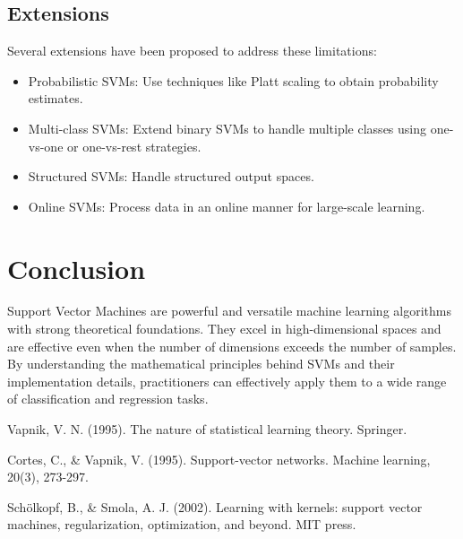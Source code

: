 \documentclass{article}
\begin{document}
\subsection{Extensions}

Several extensions have been proposed to address these limitations:
\begin{itemize}
    \item Probabilistic SVMs: Use techniques like Platt scaling to obtain probability estimates.
    \item Multi-class SVMs: Extend binary SVMs to handle multiple classes using one-vs-one or one-vs-rest strategies.
    \item Structured SVMs: Handle structured output spaces.
    \item Online SVMs: Process data in an online manner for large-scale learning.
\end{itemize}

\section{Conclusion}

Support Vector Machines are powerful and versatile machine learning algorithms with strong theoretical foundations. They excel in high-dimensional spaces and are effective even when the number of dimensions exceeds the number of samples. By understanding the mathematical principles behind SVMs and their implementation details, practitioners can effectively apply them to a wide range of classification and regression tasks.

\begin{thebibliography}{9}
Vapnik, V. N. (1995). The nature of statistical learning theory. Springer.

Cortes, C., \& Vapnik, V. (1995). Support-vector networks. Machine learning, 20(3), 273-297.

Schölkopf, B., \& Smola, A. J. (2002). Learning with kernels: support vector machines, regularization, optimization, and beyond. MIT press.
\end{thebibliography}
\end{document}
